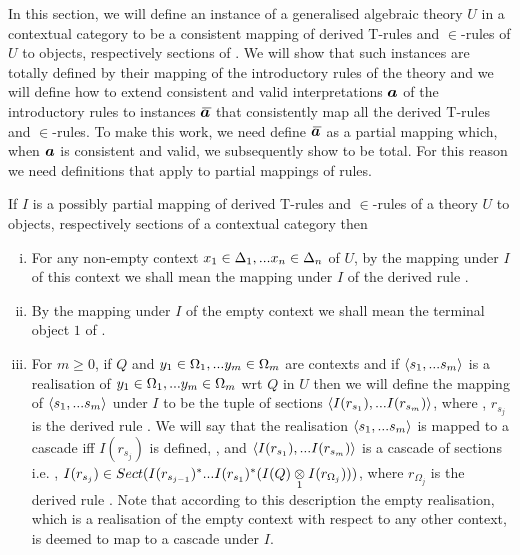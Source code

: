 
\newcommand{\clause}[1]{clause (#1) of definition \lref{consistentinterpretation}}
\newcommand{\condition}[2]{condition (#2) of \clause{#1}}

In this section, we will define an instance of a generalised algebraic theory $U$ in a contextual category \catcw to be a consistent mapping 
of derived T-rules and $\in$-rules of  $U$ to objects, respectively sections of \catc. 
We will show that such instances are totally defined by their mapping of the introductory rules of the theory and we will define how to extend 
consistent and valid interpretations $\iI$ of the introductory rules   to instances $\Ibar$ that consistently map all the derived  T-rules and $\in$-rules.
To make this work, we need define $\Ibar$ as a partial mapping which, when $\iI$ is consistent and valid, we subsequently show to be total. For this reason we need definitions that apply to partial mappings of rules.
\begin{numbereddefinition}
If $I$ is a  possibly partial mapping of derived T-rules and $\in$-rules of a theory $U$ to objects, respectively sections of a contextual category \catcw then
\begin{enumerate}[(i)]
\item
For any non-empty context $\xDelta{n}$ of $U$, by the mapping under $I$ of this context we shall mean the mapping under $I$ of the derived rule
.  
\item
By the mapping under $I$ of the empty context we shall mean the terminal object $1$ of \catc.
\item
For $m \geq 0$, if  $Q$ and $\yOmega{m}$ are contexts and if $\tuple{\sm}$ is a realisation of $\yOmega{m}$ wrt $Q$ in $U$
then we will define the mapping of  $\tuple{\sm}$ under $I$ to be the tuple of sections
$\tuple{I(r_{s_1}),...I(r_{s_m})}$, 
where \foreachj, $r_{s_j}$ is the derived rule .
We will say that the realisation $\tuple{\sm}$ is mapped to a cascade iff
 $I(r_{s_j})$ is defined, \foreachj, and 
 $\tuple{I(r_{s_1}),...I(r_{s_m})}$ is a cascade of sections i.e. \foreachj, 
 $I(r_{s_j}) \in Sect(I(r_{s_{j-1}})^*...I(r_{s_1})^*(\crossx{I(Q)}{I(r_{\Omega_j})}{1}))$,
where $r_{\Omega_j}$ is the derived rule . Note that according to this description the empty realisation, which is a realisation of the empty context with respect to any other context, is deemed to map to a cascade under $I$.  
\end{enumerate}
\end{numbereddefinition}
\newcommand{\smMappedToCacscade}{
for all contexts $Q$ and for all realisations $\tuple{\sm}$ of $\yOmega{m}$ wrt $Q$ 
which map to a cascade under $I$ ,}
\newcommand{\sjpconclusion}{\ofT{s'_j}{\Omega'_j[s_1|y_1,...s_{j-1}|y_{j-1}]}}
\newcommand{\IfIpartialmappingUtoC}{If $U$ is a generalised algebraic theory and \catcw is a contextual category 
and if $I$ is a partial mapping of derived T-rules and $\in$-rules of the theory $U$ to objects, respectively sections of the contextual category \catc}
\newcommand{\IfIpartialmappingUtoCw}{\IfIpartialmappingUtoC\ }

